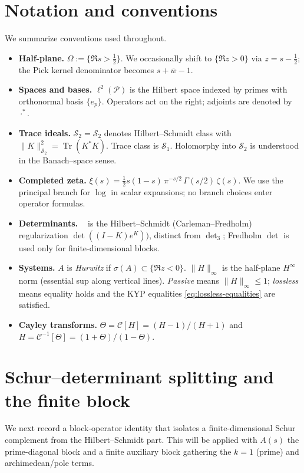 \documentclass[11pt]{article}
\theoremstyle{remark}
\newcommand{\PP}{\mathcal{P}}
\newcommand{\HS}{\mathcal{S}_2}
\DeclareMathOperator{\Tr}{Tr}
\DeclareMathOperator{\dettwo}{det_2}
\begin{document}
\section{Notation and conventions}\label{sec:notation}
We summarize conventions used throughout.
\begin{itemize}
 \item \textbf{Half-plane.} \(\Omega:=\{\Re s>\tfrac12\}\). We occasionally shift to \(\{\Re z>0\}\) via \(z=s-\tfrac12\); the Pick kernel denominator becomes \(s+\overline{w}-1\).
 \item \textbf{Spaces and bases.} \(\ell^2(\PP)\) is the Hilbert space indexed by primes with orthonormal basis \(\{e_p\}\). Operators act on the right; adjoints are denoted by \(\cdot^*\).
 \item \textbf{Trace ideals.} \(\HS=\mathcal S_2\) denotes Hilbert--Schmidt class with \(\|K\|_{\HS}^2=\Tr(K^*K)\). Trace class is \(\mathcal S_1\). Holomorphy into \(\HS\) is understood in the Banach--space sense.
 \item \textbf{Completed zeta.} \(\xi(s)=\tfrac12 s(1-s)\,\pi^{-s/2}\,\Gamma(s/2)\,\zeta(s)\). We use the principal branch for \(\log\) in scalar expansions; no branch choices enter operator formulas.
\item \textbf{Determinants.} \(\dettwo\) is the Hilbert--Schmidt (Carleman--Fredholm) regularization \(\det((I-K)e^{K}))\), distinct from \(\det_3\); Fredholm \(\det\) is used only for finite-dimensional blocks.
 \item \textbf{Systems.} \(A\) is \emph{Hurwitz} if \(\sigma(A)\subset\{\Re z<0\}\). \(\|H\|_\infty\) is the half-plane \(H^\infty\) norm (essential sup along vertical lines). \emph{Passive} means \(\|H\|_\infty\le 1\); \emph{lossless} means equality holds and the KYP equalities \eqref{eq:lossless-equalities} are satisfied.
 \item \textbf{Cayley transforms.} \(\Theta=\mathcal C[H]=(H-1)/(H+1)\) and \(H=\mathcal C^{-1}[\Theta]=(1+\Theta)/(1-\Theta)\).
\end{itemize}

\section{Schur--determinant splitting and the finite block}\label{sec:schur-split}
We next record a block-operator identity that isolates a finite-dimensional Schur complement from the Hilbert--Schmidt part. This will be applied with \(A(s)\) the prime-diagonal block and a finite auxiliary block gathering the \(k=1\) (prime) and archimedean/pole terms.
\end{document}
